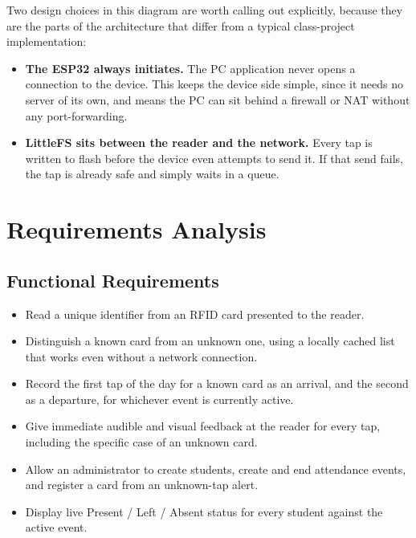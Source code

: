 Two design choices in this diagram are worth calling out explicitly, because they are the parts of the architecture that differ from a typical class-project implementation:

\begin{itemize}
    \item \textbf{The ESP32 always initiates.} The PC application never opens a connection to the device. This keeps the device side simple, since it needs no server of its own, and means the PC can sit behind a firewall or NAT without any port-forwarding.
    \item \textbf{LittleFS sits between the reader and the network.} Every tap is written to flash before the device even attempts to send it. If that send fails, the tap is already safe and simply waits in a queue.
\end{itemize}

\section{Requirements Analysis}

\subsection{Functional Requirements}
\begin{itemize}
    \item Read a unique identifier from an RFID card presented to the reader.
    \item Distinguish a known card from an unknown one, using a locally cached list that works even without a network connection.
    \item Record the first tap of the day for a known card as an arrival, and the second as a departure, for whichever event is currently active.
    \item Give immediate audible and visual feedback at the reader for every tap, including the specific case of an unknown card.
    \item Allow an administrator to create students, create and end attendance events, and register a card from an unknown-tap alert.
    \item Display live Present / Left / Absent status for every student against the active event.
\end{itemize}


